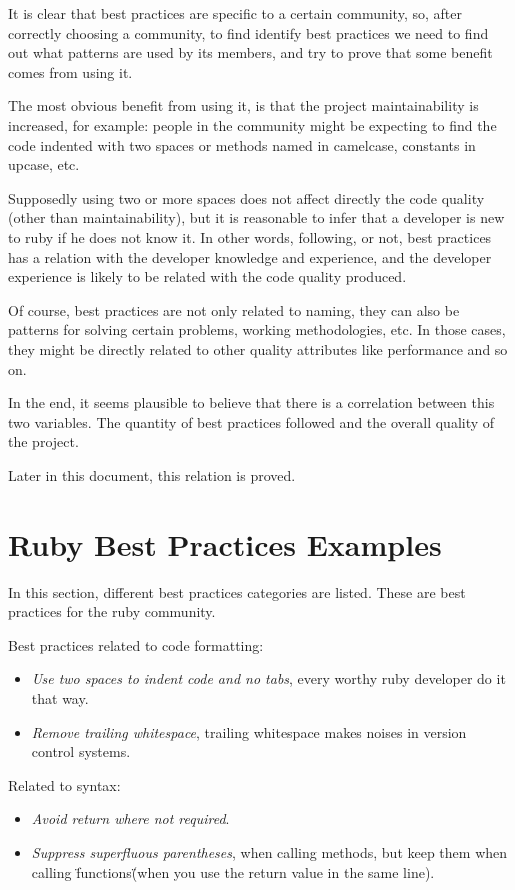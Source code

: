 It is clear that best practices are specific to a certain community, 
so, after correctly choosing a community, to find identify best practices we need
to find out what patterns are used by its members,
and try to prove that some benefit comes from using it.

The most obvious benefit from using it,
is that the project maintainability is increased,
for example: people in the community might be expecting to find the code indented with two spaces or 
methods named in camelcase, constants in upcase, etc.

Supposedly using two or more spaces does not affect directly the code quality (other than maintainability), 
but it is reasonable to infer that a developer is new to ruby if he does not know it.
In other words, following, or not, best practices has a relation with the developer knowledge and experience,
and the developer experience is likely to be related with the code quality produced.

Of course, best practices are not only related to naming,
they can also be patterns for solving certain problems, working methodologies, etc.
In those cases, they might be directly related to other quality attributes like performance and so on.

In the end, it seems plausible to believe that there is a correlation between this two variables.
The quantity of best practices followed and the overall quality of the project. 

Later in this document, this relation is proved.


\section{Ruby Best Practices Examples} \label{sec:best_practices_examples}
In this section, different best practices categories are listed.
These are best practices for the ruby community.

Best practices related to code formatting:
\begin{itemize}
\item \emph{Use two spaces to indent code and no tabs}, every worthy ruby developer do it that way.
\item \emph{Remove trailing whitespace}, trailing whitespace makes noises in version control systems.
\end{itemize}

Related to syntax:
\begin{itemize}
\item \emph{Avoid return where not required}.
\item \emph{Suppress superfluous parentheses}, when calling methods, 
but keep them when calling \"functions\" (when you use the return value in the same line).
\end{itemize}

